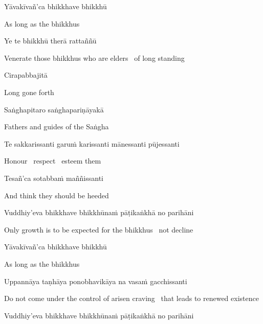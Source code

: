 Yāvakīvañ'ca bhikkhave bhikkhū

\begin{english}
  As long as the bhikkhus
\end{english}

Ye te bhikkhū therā rattaññū

\begin{english}
  Venerate those bhikkhus who are elders \breathmark\ of long standing
\end{english}

Cirapabbajitā

\begin{english}
  Long gone forth
\end{english}

Saṅghapitaro saṅghapariṇāyakā

\begin{english}
  Fathers and guides of the Saṅgha
\end{english}

Te sakkarissanti garuṁ karissanti mānessanti pūjessanti

\begin{english}
  Honour \breathmark\ respect \breathmark\ esteem them
\end{english}

Tesañ'ca sotabbaṁ maññissanti

\begin{english}
  And think they should be heeded
\end{english}

Vuddhiy'eva bhikkhave bhikkhūnaṁ pāṭikaṅkhā no parihāni

\begin{english}
  Only growth is to be expected for the bhikkhus \breathmark\ not decline
\end{english}

Yāvakīvañ'ca bhikkhave bhikkhū

\begin{english}
  As long as the bhikkhus
\end{english}

Uppannāya taṇhāya ponobhavikāya na vasaṁ gacchissanti

\begin{english-hang}
  Do not come under the control of arisen craving \breathmark\ that leads to renewed existence
\end{english-hang}

Vuddhiy'eva bhikkhave bhikkhūnaṁ pāṭikaṅkhā no parihāni

